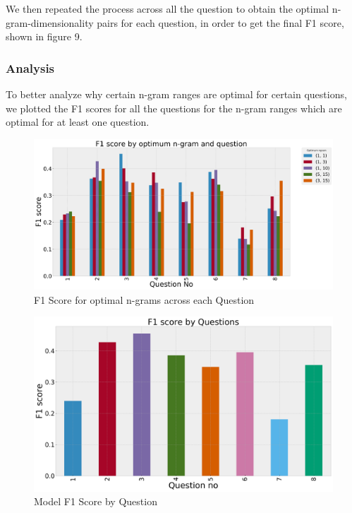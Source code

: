 \documentclass[10pt,letterpaper]{article}
\begin{document}
We then repeated the process across all the question to obtain the optimal n-gram-dimensionality pairs for each question, in order to get the final F1 score, shown in figure 9.


\subsubsection{Analysis}
To better analyze why certain n-gram ranges are optimal for certain questions, we plotted the F1 scores for all the questions for the n-gram ranges which are optimal for at least one question. 

\begin{figure}[ht]
\begin{center}
\includegraphics[scale = 0.175]{img/F1ByOptimumRanges.png}
\end{center}
\caption{F1 Score for optimal n-grams across each Question}
\end{figure}

 \begin{figure}[ht]
\begin{center}
\includegraphics[scale = 0.19 ]{img/F1ByQuestions.png}
\end{center}
\caption{Model F1 Score by Question}
\end{figure}
\end{document}
